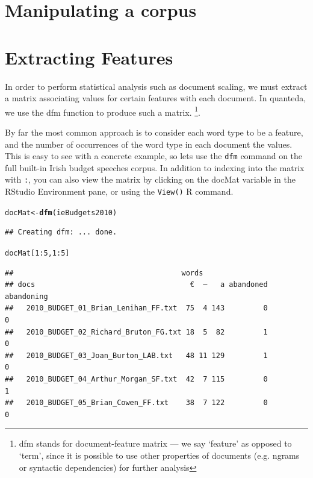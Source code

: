 \documentclass[11pt]{article}\usepackage[]{graphicx}\usepackage[]{color}
\makeatletter
\newcommand{\hlnum}[1]{\textcolor[rgb]{0.686,0.059,0.569}{#1}}%
\newcommand{\hlopt}[1]{\textcolor[rgb]{0,0,0}{#1}}%
\newcommand{\hlstd}[1]{\textcolor[rgb]{0.345,0.345,0.345}{#1}}%
\newcommand{\hlkwb}[1]{\textcolor[rgb]{0.69,0.353,0.396}{#1}}%
\newcommand{\hlkwd}[1]{\textcolor[rgb]{0.737,0.353,0.396}{\textbf{#1}}}%
\newenvironment{kframe}{%
 \def\at@end@of@kframe{}%
 \ifinner\ifhmode%
  \def\at@end@of@kframe{\end{minipage}}%
  \begin{minipage}{\columnwidth}%
 \fi\fi%
 \def\FrameCommand##1{\hskip\@totalleftmargin \hskip-\fboxsep
 \colorbox{shadecolor}{##1}\hskip-\fboxsep
     \hskip-\linewidth \hskip-\@totalleftmargin \hskip\columnwidth}%
 \MakeFramed {\advance\hsize-\width
   \@totalleftmargin\z@ \linewidth\hsize
   \@setminipage}}%
 {\par\unskip\endMakeFramed%
 \at@end@of@kframe}
\newenvironment{knitrout}{}{} %
\makeatother
\begin{document}
\section{Manipulating a corpus}


\section{Extracting Features}

In order to perform statistical analysis such as document scaling, we must extract a matrix associating values for certain features with each document. In quanteda, we use the dfm function to produce such a matrix. \footnote{dfm stands for document-feature matrix --- we say `feature' as opposed to `term', since it is possible to use other properties of documents (e.g. ngrams or syntactic dependencies) for further analysis}. 

By far the most common approach is to consider each word type to be a feature, and the number of occurrences of the word type in each document the values. This is easy to see with a concrete example, so lets use the \texttt{dfm} command on the full built-in Irish budget speeches corpus. In addition to indexing into the matrix with \texttt{:}, you can also view the matrix by clicking on the docMat variable in the RStudio Environment pane, or using the \texttt{View()} R command.


\begin{knitrout}\footnotesize
{}\color{fgcolor}\begin{kframe}
\begin{alltt}
\hlstd{docMat} \hlkwb{<-} \hlkwd{dfm}\hlstd{(ieBudgets2010)}
\end{alltt}
\begin{verbatim}
## Creating dfm: ... done.
\end{verbatim}
\begin{alltt}
\hlstd{docMat[}\hlnum{1}\hlopt{:}\hlnum{5}\hlstd{,}\hlnum{1}\hlopt{:}\hlnum{5}\hlstd{]}
\end{alltt}
\begin{verbatim}
##                                       words
## docs                                    €  —   a abandoned abandoning
##   2010_BUDGET_01_Brian_Lenihan_FF.txt  75  4 143         0          0
##   2010_BUDGET_02_Richard_Bruton_FG.txt 18  5  82         1          0
##   2010_BUDGET_03_Joan_Burton_LAB.txt   48 11 129         1          0
##   2010_BUDGET_04_Arthur_Morgan_SF.txt  42  7 115         0          1
##   2010_BUDGET_05_Brian_Cowen_FF.txt    38  7 122         0          0
\end{verbatim}
\end{kframe}
\end{knitrout}
\end{document}
